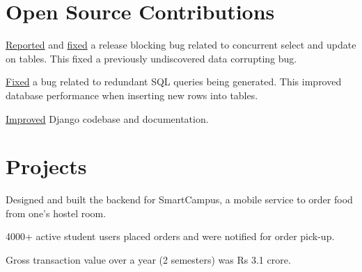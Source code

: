 \documentclass[]{resume}
\begin{document}
\begin{minipage}[t]{0.70\textwidth}
\section{Open Source Contributions}
\vspace{2pt}
\vspace{1pt}
\begin{tightemize}
\item \href{https://code.djangoproject.com/ticket/31246}{Reported} and \href{https://github.com/django/django/pull/12434}{fixed}
a release blocking bug related to concurrent select and update on tables. This fixed a previously undiscovered data corrupting bug.
\item \justifying\href{https://github.com/django/django/pull/12496}{Fixed} a bug related to redundant SQL queries being generated.
This improved database performance when inserting new rows into tables.
\item \justifying \href{https://github.com/django/django/pulls?q=author\%3Aabhijeetviswa}{Improved} Django codebase and documentation.
\end{tightemize}
\subsectionsep

\section{Projects}
\vspace{2pt}
\vspace{2pt}
\begin{tightemize}
 \item Designed and built the backend for SmartCampus, a mobile service to order food from one's hostel room.
 \item 4000+ active student users placed orders and were notified for order pick-up.
 \item Gross transaction value over a year (2 semesters) was Rs 3.1 crore.
\end{tightemize}
\subsectionsep


\end{minipage}
\end{document}
